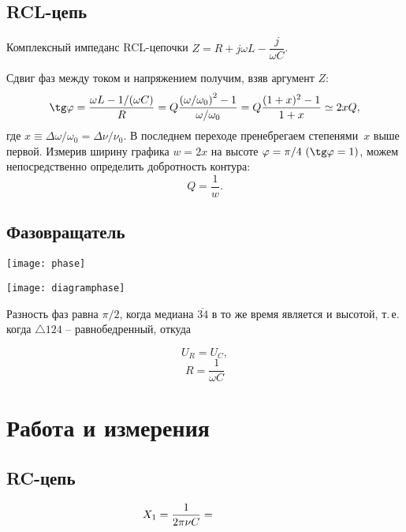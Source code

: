 \documentclass{physlab}
\begin{document}
\subsection*{RCL-цепь}

\vspace{-1.75ex}
Комплексный импеданс RCL-цепочки $Z=R+j\omega L - \dfrac{j}{\omega C}$.
\vspace{.75\parskip}

Сдвиг фаз между током и напряжением получим, взяв аргумент $Z$:
$$\tg\varphi = \frac{\omega L - 1/(\omega C)}{R} = Q\frac{\left(\omega/\omega_0\right)^2 - 1}{\omega/\omega_0} = Q\frac{(1+x)^2-1}{1+x} \simeq 2x Q,$$
где $x \equiv \Delta \omega / \omega_0 = \Delta \nu / \nu_0$.
В последнем переходе пренебрегаем степенями~$x$ выше первой.
Измерив ширину графика $w=2x$ на высоте $\varphi = \pi / 4\ (\tg\varphi = 1)$, можем непосредственно определить добротность контура:
$$Q = \frac{1}{w}.$$

\subsection*{Фазовращатель}

\vspace{-7.5mm}
\begin{minipage}{.65\tw}
    \texttt{[image: phase]}
\end{minipage}
\hfill
\begin{minipage}{.32\tw}
    \texttt{[image: diagramphase]}
\end{minipage}\smallskip

Разность фаз равна $\pi /2$, когда медиана $\overline{34}$ в то же время является и высотой, т.\,е. когда $\triangle 124$ -- равнобедренный, откуда

\[U_R=U_C,\]
\[R=\frac{1}{\omega C}\]

\section{Работа и измерения}

\subsection*{RC-цепь}

$$X_1 = \dfrac{1}{2 \pi \nu C} = \val$$
\end{document}
